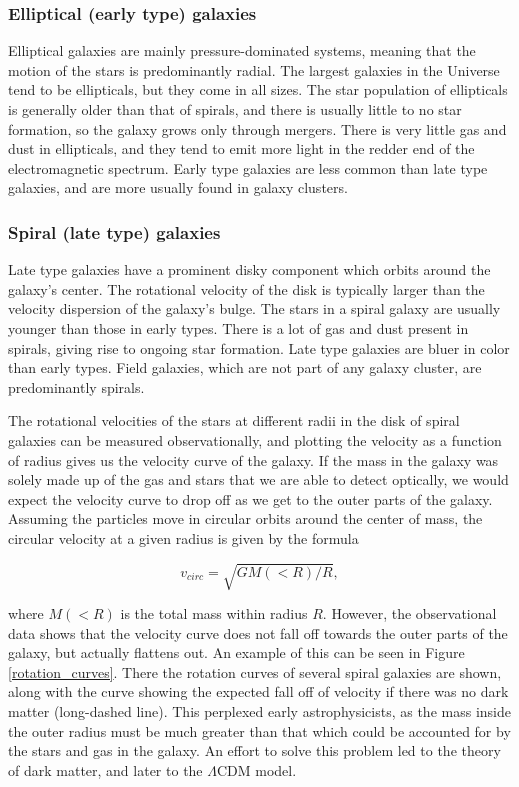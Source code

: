\subsubsection{Elliptical (early type) galaxies}
Elliptical galaxies are mainly pressure-dominated systems, meaning that the motion of the stars is predominantly radial. The largest galaxies in the Universe tend to be ellipticals, but they come in all sizes. The star population of ellipticals is generally older than that of spirals, and there is usually little to no star formation, so the galaxy grows only through mergers. There is very little gas and dust in ellipticals, and they tend to emit more light in the redder end of the electromagnetic spectrum. Early type galaxies are less common than late type galaxies, and are more usually found in galaxy clusters.

\subsubsection{Spiral (late type) galaxies} \label{lates}
Late type galaxies have a prominent disky component which orbits around the galaxy's center. The rotational velocity of the disk is typically larger than the velocity dispersion of the galaxy's bulge. The stars in a spiral galaxy are usually younger than those in early types. There is a lot of gas and dust present in spirals, giving rise to ongoing star formation. Late type galaxies are bluer in color than early types. Field galaxies, which are not part of any galaxy cluster, are predominantly spirals. 


The rotational velocities of the stars at different radii in the disk of spiral galaxies can be measured observationally, and plotting the velocity as a function of radius gives us the velocity curve of the galaxy. If the mass in the galaxy was solely made up of the gas and stars that we are able to detect optically, we would expect the velocity curve to drop off as we get to the outer parts of the galaxy. Assuming the particles move in circular orbits around the center of mass, the circular velocity at a given radius is given by the formula

\begin{equation}
    v_{circ} = \sqrt{GM(<R)/R}, 
\end{equation}

where $M(<R)$ is the total mass within radius $R$. However, the observational data shows that the velocity curve does not fall off towards the outer parts of the galaxy, but actually flattens out. An example of this can be seen in Figure \ref{rotation_curves}. There the rotation curves of several spiral galaxies are shown, along with the curve showing the expected fall off of velocity if there was no dark matter (long-dashed line). This perplexed early astrophysicists, as the mass inside the outer radius must be much greater than that which could be accounted for by the stars and gas in the galaxy. An effort to solve this problem led to the theory of dark matter, and later to the $\Lambda$CDM model.

